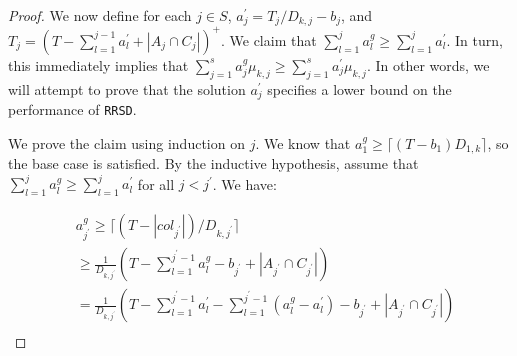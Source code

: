 \documentclass[letterpaper,11pt]{article}
\begin{document}
\begin{proof}
    We now define for each $j \in S$, $a^{\prime}_{j} = T_{j}/D_{k, j} - b_j$,
    and $T_{j} = \left(T - \sum^{j-1}_{l=1}a^{\prime}_{l} + |A_{j}\cap C_{j}|\right)^{+}$. 
    We claim that $\sum^{j}_{l=1}a^{g}_{l} \geq \sum^{j}_{l=1}a^{\prime}_{l}$. In turn, this immediately implies that $\sum^{s}_{j=1}a_{j}^{g}\mu_{k, j} \geq \sum^{s}_{j=1}a_{j}^{\prime}\mu_{k, j}$. In other words, we will attempt to prove that the solution $a^{\prime}_{j}$ specifies a lower bound on the performance of \texttt{RRSD}. 
    
    We prove the claim using induction on $j$. We know that $a^{g}_{1} \geq \lceil (T - b_1)D_{1, k}\rceil$, so the base case is satisfied. By the inductive hypothesis, assume that $\sum_{l=1}^{j}a^{g}_{l} \geq \sum^{j}_{l=1}a^{\prime}_{l}$ for all $j < j^{\prime}$. We have:
    \iffalse
    \begin{equation*}
       a^{g}_{j^{\prime}} \geq \lceil (T - |col_{s^{\prime}}|)/D_{k, s^{\prime}}\rceil
    \end{equation*}
    \begin{equation*}
       \geq \frac{1}{D_{k, j^{\prime}}}\left(T - \sum^{j-1}_{l=1}n^{g}_{l} - b_{j^{\prime}} + |A_{j^{\prime}}\cap C_{j^{\prime}}|\right)
    \end{equation*}
    \begin{equation*}
        = \frac{1}{D_{k, j^{\prime}}}\left(T - \sum^{j-1}_{l=1}a^{\prime}_{l} - \sum^{j-1}_{l=1}\left(a^{g}_{l} - a^{\prime}_{l}\right) - b_{j^{\prime}} + |A_{j^{\prime}}\cap C_{j^{\prime}}|\right)
    \end{equation*}
    \begin{equation*}
        =  a^{\prime}_{j^{\prime}} - \frac{1}{D_{k, j^{\prime}}}\sum^{j-1}_{l=1}\left(a^{g}_{l} - a^{\prime}_{l}\right)
    \end{equation*}
    \fi
    \begin{align*}
        &a^{g}_{j^{\prime}} \geq \lceil (T - |col_{j^{\prime}}|)/D_{k, j^{\prime}}\rceil \\
        &\geq \frac{1}{D_{k, j^{\prime}}}\left(T - \sum^{j^{\prime}-1}_{l=1}a^{g}_{l} - b_{j^{\prime}} + |A_{j^{\prime}}\cap C_{j^{\prime}}|\right) \\
        &= \frac{1}{D_{k, j^{\prime}}}\left(T - \sum^{j^{\prime}-1}_{l=1}a^{\prime}_{l} - \sum^{j^{\prime}-1}_{l=1}\left(a^{g}_{l} - a^{\prime}_{l}\right) - b_{j^{\prime}} + |A_{j^{\prime}}\cap C_{j^{\prime}}|\right) \\

\end{align*}
\end{proof}
\end{document}
